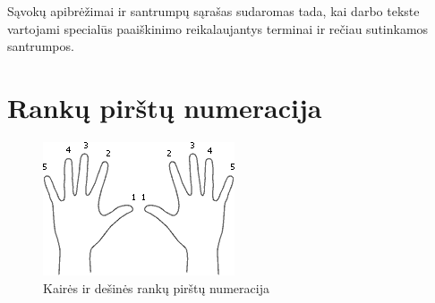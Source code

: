 \documentclass{VUMIFPSbakalaurinis}
\begin{document}
Sąvokų apibrėžimai ir santrumpų sąrašas sudaromas tada, kai darbo tekste
vartojami specialūs paaiškinimo reikalaujantys terminai ir rečiau sutinkamos
santrumpos.

\appendix  %

\section{Rankų pirštų numeracija}
\label{appendix:pirstai}
\begin{figure}[H]
    \centering
    \includegraphics[scale=1]{img/fingers}
    \caption{Kairės ir dešinės rankų pirštų numeracija}
    \label{img:fingers}
\end{figure}


\end{document}
